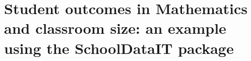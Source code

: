 \documentclass[openany]{book}
\begin{document}






\section[Usage Example]{Student outcomes in Mathematics and classroom size: an example using the SchoolDataIT package} \label{section:Example}
\end{document}
